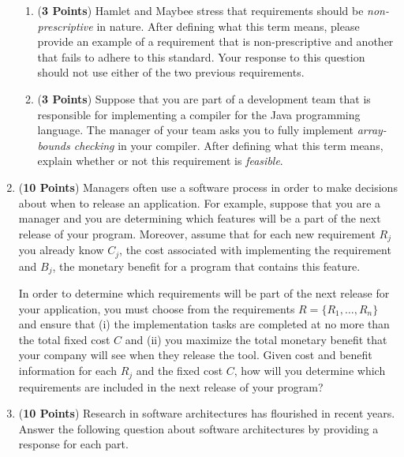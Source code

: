 \documentclass[12pt,epsf,psfig,graphics]{article}
\begin{document}
\begin{enumerate}
\begin{enumerate}
        \item ({\bf 3 Points}) Hamlet and Maybee stress that
          requirements should be {\em non-prescriptive} in nature.
          After defining what this term means, please provide an
          example of a requirement that is non-prescriptive and
          another that fails to adhere to this standard.  Your
          response to this question should not use either of the two
          previous requirements.

        \item ({\bf 3 Points}) Suppose that you are part of a
          development team that is responsible for implementing a
          compiler for the Java programming language.  The manager of
          your team asks you to fully implement {\em array-bounds
            checking} in your compiler.  After defining what this term
          means, explain whether or not this requirement is {\em
            feasible}.

        \end{enumerate}

\newpage

\item ({\bf 10 Points}) Managers often use a software process in order
  to make decisions about when to release an application.  For
  example, suppose that you are a manager and you are determining
  which features will be a part of the next release of your program.
  Moreover, assume that for each new requirement $R_j$ you already
  know $C_j$, the cost associated with implementing the requirement
  and $B_j$, the monetary benefit for a program that contains this
  feature.

  In order to determine which requirements will be part of the next
  release for your application, you must choose from the requirements
  $R = \{ R_1, \ldots, R_n \}$ and ensure that (i) the implementation
  tasks are completed at no more than the total fixed cost $C$ and
  (ii) you maximize the total monetary benefit that your company will
  see when they release the tool.  Given cost and benefit information
  for each $R_j$ and the fixed cost $C$, how will you determine which
  requirements are included in the next release of your program?
    
\newpage

\item ({\bf 10 Points}) Research in software architectures has flourished
in recent years.  Answer the following question about software architectures
by providing a response for each part.


\end{enumerate}
\end{document}
